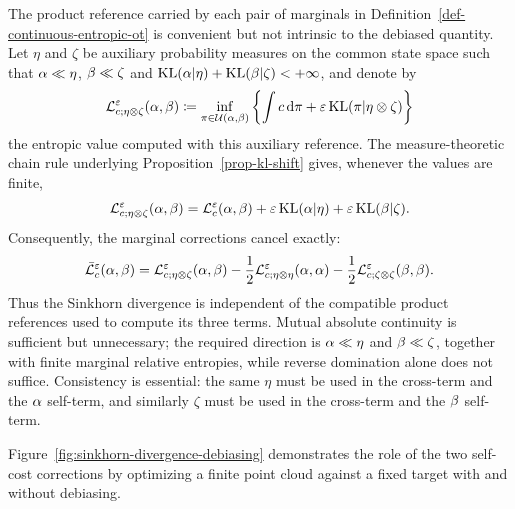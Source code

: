 \begin{rem}\label{rem-sinkhorn-reference-invariance}
	The product reference carried by each pair of marginals in Definition~\ref{def-continuous-entropic-ot} is convenient but not intrinsic to the debiased quantity. Let $\eta$ and $\zeta$ be auxiliary probability measures on the common state space such that $\alpha\ll\eta$, $\beta\ll\zeta$ and $\operatorname{KL}(\alpha|\eta)+\operatorname{KL}(\beta|\zeta)<+\infty$, and denote by
	\[
		\mathcal{L}_{c;\eta\otimes\zeta}^\varepsilon(\alpha,\beta)
		\coloneqq
		\inf_{\pi\in\mathcal{U}(\alpha,\beta)}
		\left\{
			\int c\,\mathrm{d}\pi+\varepsilon\operatorname{KL}(\pi|\eta\otimes\zeta)
		\right\}
	\]
	the entropic value computed with this auxiliary reference. The measure-theoretic chain rule underlying Proposition~\ref{prop-kl-shift} gives, whenever the values are finite,
	\[
		\mathcal{L}_{c;\eta\otimes\zeta}^\varepsilon(\alpha,\beta)
		=
		\mathcal{L}_c^\varepsilon(\alpha,\beta)
		+\varepsilon\operatorname{KL}(\alpha|\eta)+\varepsilon\operatorname{KL}(\beta|\zeta).
	\]
	Consequently, the marginal corrections cancel exactly:
	\begin{equation}\label{eq-sinkhorn-reference-invariance}
		\bar{\mathcal{L}}_c^\varepsilon(\alpha,\beta)
		=
		\mathcal{L}_{c;\eta\otimes\zeta}^\varepsilon(\alpha,\beta)
		-\frac12\mathcal{L}_{c;\eta\otimes\eta}^\varepsilon(\alpha,\alpha)
		-\frac12\mathcal{L}_{c;\zeta\otimes\zeta}^\varepsilon(\beta,\beta).
	\end{equation}
	Thus the Sinkhorn divergence is independent of the compatible product references used to compute its three terms. Mutual absolute continuity is sufficient but unnecessary; the required direction is $\alpha\ll\eta$ and $\beta\ll\zeta$, together with finite marginal relative entropies, while reverse domination alone does not suffice. Consistency is essential: the same $\eta$ must be used in the cross-term and the $\alpha$ self-term, and similarly $\zeta$ must be used in the cross-term and the $\beta$ self-term.
\end{rem}

Figure~\ref{fig:sinkhorn-divergence-debiasing} demonstrates the role of the two self-cost corrections by optimizing a finite point cloud against a fixed target with and without debiasing.

